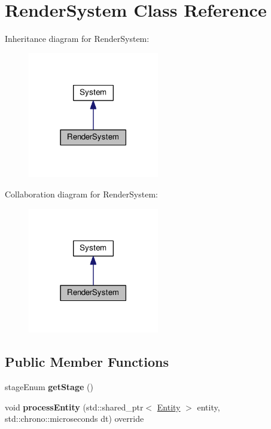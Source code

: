 \hypertarget{classRenderSystem}{\section{Render\-System Class Reference}
\label{classRenderSystem}
}


Inheritance diagram for Render\-System\-:
\nopagebreak
\begin{figure}[H]
\begin{center}
\leavevmode
\includegraphics[width=162pt]{classRenderSystem__inherit__graph}
\end{center}
\end{figure}


Collaboration diagram for Render\-System\-:
\nopagebreak
\begin{figure}[H]
\begin{center}
\leavevmode
\includegraphics[width=162pt]{classRenderSystem__coll__graph}
\end{center}
\end{figure}
\subsection*{Public Member Functions}
\begin{DoxyCompactItemize}
\item 
\hypertarget{classRenderSystem_a480dc6277193c0b252b8d3ceba537a52}{stage\-Enum {\bfseries get\-Stage} ()}\label{classRenderSystem_a480dc6277193c0b252b8d3ceba537a52}

\item 
\hypertarget{classRenderSystem_a19db251b0a94bcab13e79d5cb5d2afbf}{void {\bfseries process\-Entity} (std\-::shared\-\_\-ptr$<$ \hyperlink{classEntity}{Entity} $>$ entity, std\-::chrono\-::microseconds dt) override}\label{classRenderSystem_a19db251b0a94bcab13e79d5cb5d2afbf}

\end{DoxyCompactItemize}
